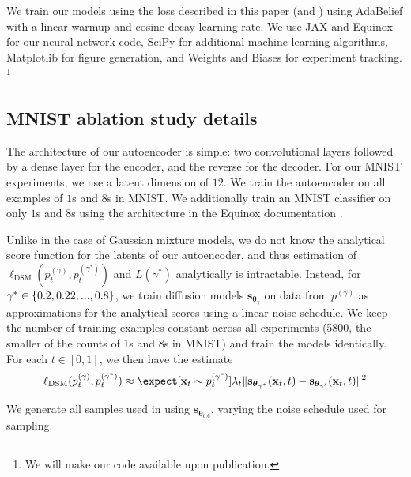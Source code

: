 \documentclass[11pt]{article}
\newcommand{\vect}[1]{\mathbf{#1}}
\theoremstyle{plain}
\newcommand{\1}{\mathbbm{1}}
\DeclarePairedDelimiter{\norm}{\lVert}{\rVert}
\DeclarePairedDelimiter{\set}{\lbrace}{\rbrace}
\newcommand{\btheta}{{\boldsymbol{\theta}}}
\newcommand{\vx}{\vect{x}}
\newcommand{\vs}{\vect{s}}
\newcommand{\ldsm}{\ell_\mathrm{DSM}}
\newcommand{\pdist}[2][]{p_{#1}^{(#2)}}
\begin{document}
\begin{appendices}
We train our models using the loss described in this paper (and \citep{song2021scorebasedgenerativemodelingstochastic}) using AdaBelief \citep{zhuang2020adabelief} with a linear warmup and cosine decay learning rate. We use JAX \citep{jax2018github} and Equinox \citep{kidger2021equinox} for our neural network code, SciPy \citep{2020SciPy-NMeth} for additional machine learning algorithms, Matplotlib \citep{Hunter2007matplotlib} for figure generation, and Weights and Biases \citep{wandb} for experiment tracking.
\footnote{We will make our code available upon publication.}

\subsection{MNIST ablation study details}\label{sec: MNIST Exp Details}

The architecture of our autoencoder is simple: two convolutional layers followed by a dense layer for the encoder, and the reverse for the decoder. For our MNIST experiments, we use a latent dimension of $12$. We train the autoencoder on all examples of $1$s and $8$s in MNIST. We additionally train an MNIST classifier on only $1$s and $8$s using the architecture in the Equinox documentation \citep{kidger2021equinox}.

Unlike in the case of Gaussian mixture models, we do not know the analytical score function for the latents of our autoencoder, and thus estimation of $\ldsm(\pdist[t]{\gamma}, \pdist[t]{\gamma^*})$ and $L(\gamma^*)$ analytically is intractable. Instead, for $\gamma^*\in \set{0.2,0.22,...,0.8}$, we train diffusion models $\vs_{\btheta_\gamma}$ on data from $\pdist{\gamma}$ as approximations for the analytical scores using a linear noise schedule. We keep the number of training examples constant across all experiments (5800, the smaller of the counts of 1s and 8s in MNIST) and train the models identically. For each $t\in [0,1]$, we then have the estimate \[\ldsm(\pdist[t]{\gamma}, \pdist[t]{\gamma^*})\approx \expect[\vx_t\sim \pdist[t]{\gamma^{*}}]{\lambda_t \norm{\vs_{\btheta_{\gamma^*}}(\vx_t, t) - \vs_{\btheta_{\gamma'}}(\vx_t, t)}^2}\]

We generate all samples used in  using $\vs_{\btheta_{0.6}}$, varying the noise schedule used for sampling.



\end{appendices}
\end{document}

